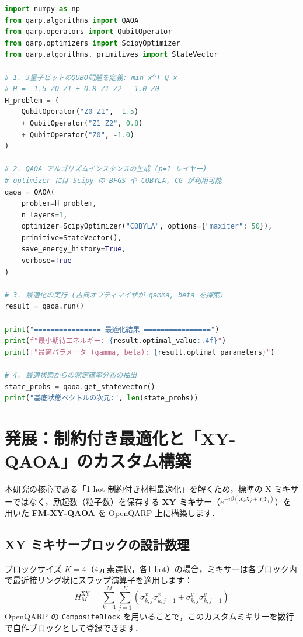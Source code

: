 \documentclass[11pt,a4paper]{ltjsarticle}
\begin{document}
\begin{lstlisting}[language=python, caption={OpenQARP を用いた標準 QAOA の実行スクリプト}]
import numpy as np
from qarp.algorithms import QAOA
from qarp.operators import QubitOperator
from qarp.optimizers import ScipyOptimizer
from qarp.algorithms._primitives import StateVector

# 1. 3量子ビットのQUBO問題を定義: min x^T Q x
# H = -1.5 Z0 Z1 + 0.8 Z1 Z2 - 1.0 Z0
H_problem = (
    QubitOperator("Z0 Z1", -1.5)
    + QubitOperator("Z1 Z2", 0.8)
    + QubitOperator("Z0", -1.0)
)

# 2. QAOA アルゴリズムインスタンスの生成 (p=1 レイヤー)
# optimizer には Scipy の BFGS や COBYLA, CG が利用可能
qaoa = QAOA(
    problem=H_problem,
    n_layers=1,
    optimizer=ScipyOptimizer("COBYLA", options={"maxiter": 50}),
    primitive=StateVector(),
    save_energy_history=True,
    verbose=True
)

# 3. 最適化の実行 (古典オプティマイザが gamma, beta を探索)
result = qaoa.run()

print("================ 最適化結果 ================")
print(f"最小期待エネルギー: {result.optimal_value:.4f}")
print(f"最適パラメータ (gamma, beta): {result.optimal_parameters}")

# 4. 最適状態からの測定確率分布の抽出
state_probs = qaoa.get_statevector()
print("基底状態ベクトルの次元:", len(state_probs))
\end{lstlisting}

\section{発展：制約付き最適化と「XY-QAOA」のカスタム構築}

本研究の核心である「1-hot 制約付き材料最適化」を解くため，標準の X ミキサーではなく，励起数（粒子数）を保存する \textbf{XY ミキサー}（$e^{-i\beta(X_i X_j + Y_i Y_j)}$）を用いた \textbf{FM-XY-QAOA} を OpenQARP 上に構築します．

\subsection{XY ミキサーブロックの設計数理}
ブロックサイズ $K=4$（4元素選択，各1-hot）の場合，ミキサーは各ブロック内で最近接リング状にスワップ演算子を適用します：
\begin{equation}
    H_M^{\mathrm{XY}} = \sum_{k=1}^M \sum_{j=1}^{K} \left( \sigma_{k, j}^x \sigma_{k, j+1}^x + \sigma_{k, j}^y \sigma_{k, j+1}^y \right)
\end{equation}
OpenQARP の \texttt{CompositeBlock} を用いることで，このカスタムミキサーを数行で自作ブロックとして登録できます．
\end{document}
